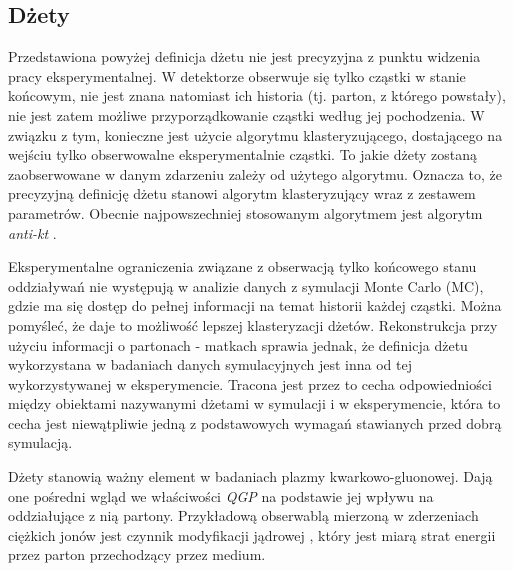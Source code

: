 \subsection{Dżety}
\label{subsec:dzet-def}

Przedstawiona powyżej definicja dżetu nie jest precyzyjna z punktu widzenia pracy eksperymentalnej. W detektorze obserwuje się tylko cząstki w stanie końcowym, nie jest znana natomiast ich historia (tj. parton, z którego powstały), nie jest zatem możliwe przyporządkowanie cząstki według jej pochodzenia. W związku z tym, konieczne jest użycie algorytmu klasteryzującego, dostającego na wejściu tylko obserwowalne eksperymentalnie cząstki. 
To jakie dżety zostaną zaobserwowane w danym zdarzeniu zależy od użytego algorytmu. Oznacza to, że precyzyjną definicję dżetu stanowi algorytm klasteryzujący wraz z zestawem parametrów. Obecnie najpowszechniej stosowanym algorytmem jest algorytm \textit{anti-kt} \cite{Cacciari:2008gp}.





Eksperymentalne ograniczenia związane z obserwacją tylko końcowego stanu oddziaływań nie występują w analizie danych z symulacji Monte Carlo (MC), gdzie  ma się dostęp do pełnej informacji na temat historii każdej cząstki. 
Można pomyśleć, że daje to możliwość lepszej klasteryzacji dżetów. 
Rekonstrukcja przy użyciu informacji o partonach - matkach sprawia jednak, że definicja dżetu wykorzystana w badaniach danych symulacyjnych jest inna od tej wykorzystywanej w eksperymencie. Tracona jest przez to cecha odpowiedniości między obiektami nazywanymi dżetami w symulacji  i w eksperymencie, która to cecha jest niewątpliwie jedną z podstawowych wymagań stawianych przed dobrą symulacją.

Dżety stanowią ważny element w badaniach plazmy kwarkowo-gluonowej.
Dają one pośredni wgląd we właściwości \textit{QGP} na podstawie jej wpływu na oddziałujące z nią partony. Przykładową obserwablą mierzoną w zderzeniach ciężkich jonów jest czynnik modyfikacji jądrowej , który jest miarą strat energii przez parton przechodzący przez medium.


